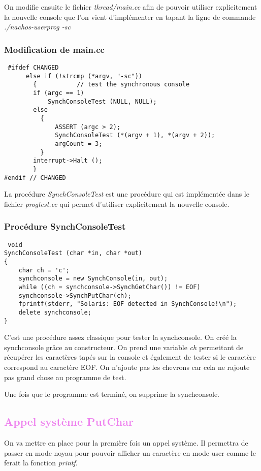 \documentclass[a4paper,10pt]{report}
\begin{document}
On modifie ensuite le fichier \emph{thread/main.cc} afin de pouvoir utiliser explicitement la nouvelle console que l'on vient d'implémenter en tapant la ligne 
de commande \emph{./nachos-userprog -sc}
\textcolor{TealBlue}{\subsubsection*{Modification de main.cc}}
\begin{lstlisting}
 #ifdef CHANGED
	  else if (!strcmp (*argv, "-sc"))
	    {			// test the synchronous console
		if (argc == 1)
		    SynchConsoleTest (NULL, NULL);
		else
		  {
		      ASSERT (argc > 2);
		      SynchConsoleTest (*(argv + 1), *(argv + 2));
		      argCount = 3;
		  }
		interrupt->Halt ();
	    }
#endif // CHANGED
\end{lstlisting}
La procédure \emph{SynchConsoleTest} est une procédure qui est implémentée dans le fichier \emph{progtest.cc} qui permet d'utiliser explicitement la nouvelle
console.

\textcolor{TealBlue}{\subsubsection*{Procédure SynchConsoleTest}}
\begin{lstlisting}
 void
SynchConsoleTest (char *in, char *out)
{
    char ch = 'c';
    synchconsole = new SynchConsole(in, out);
    while ((ch = synchconsole->SynchGetChar()) != EOF)
    synchconsole->SynchPutChar(ch);
    fprintf(stderr, "Solaris: EOF detected in SynchConsole!\n");
    delete synchconsole;
}
\end{lstlisting}
C'est une procédure assez classique pour tester la synchconsole. On créé la synchconsole grâce au constructeur. On prend une variable \emph{ch} permettant
de récupérer les caractères tapés sur la console et également de tester si le caractère correspond au caractère EOF. On n'ajoute pas les chevrons car cela 
ne rajoute pas grand chose au programme de test.

Une fois que le programme est terminé, on supprime la synchconsole.
\newpage
\textcolor{Violet}{\section{Appel système PutChar}}
  On va mettre en place pour la première fois un appel système. Il permettra de passer en mode noyau pour pouvoir afficher un caractère en mode user comme le
  ferait la fonction \emph{printf}.
  
\end{document}
